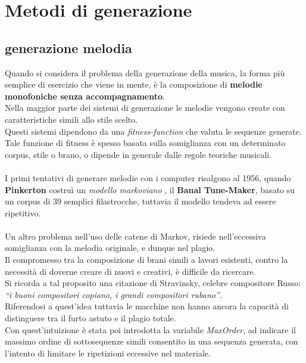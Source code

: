 \documentclass[a4paper,12pt]{report}
\begin{document}
\chapter{Metodi di generazione}

\section{generazione melodia}

Quando si considera il problema della generazione della musica, la forma più semplice di esercizio che viene in mente, è la composizione di \textbf{melodie monofoniche senza accompagnamento}.\\
Nella maggior parte dei sistemi di generazione le melodie vengono create con caratteristiche simili allo stile scelto.\\
Questi sistemi dipendono da una \textit{fitness-function} che valuta le sequenze generate.\\
Tale funzione di fitness è spesso basata sulla somiglianza con un determinato corpus, stile o brano, o dipende in generale dalle regole teoriche musicali.\\
\\
I primi tentativi di generare melodie con i computer risalgono al 1956, quando \textbf{Pinkerton} costruì un \textit{modello markoviano} , il \textbf{Banal Tune-Maker}, basato su un corpus di 39 semplici filastrocche, tuttavia il modello tendeva ad essere ripetitivo.\\
\\
Un altro problema nell'uso delle catene di Markov, risiede nell'eccessiva somiglianza con la melodia originale, e dunque nel plagio. \\
Il compromesso tra la composizione di brani simili a lavori esistenti, contro la necessità di doverne creare di nuovi e creativi, è difficile da ricercare. \\
Si ricorda a tal proposito una citazione di Stravinsky, celebre compositore Russo: \\
\textit{“i buoni compositori copiano, i grandi compositori rubano”}.\\
Riferendosi a quest'idea tuttavia le macchine non hanno ancora la capacità di distinguere tra il furto astuto e il plagio totale. \\
Con quest'intuizione è stata poi introdotta la variabile \textit{MaxOrder}, ad indicare il massimo ordine di sottosequenze simili consentito in una sequenza generata, con l'intento di limitare le ripetizioni eccessive nel materiale. \\
\end{document}
